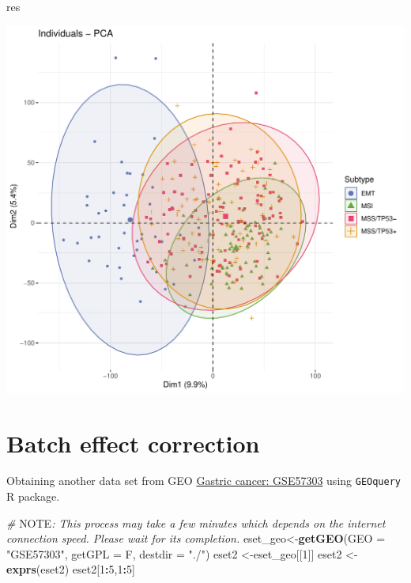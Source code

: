 \documentclass[
  12pt,
]{book}
\newenvironment{Shaded}{\begin{snugshade}}{\end{snugshade}}
\newcommand{\AlertTok}[1]{\textcolor[rgb]{0.94,0.16,0.16}{#1}}
\newcommand{\AttributeTok}[1]{\textcolor[rgb]{0.13,0.29,0.53}{#1}}
\newcommand{\CommentTok}[1]{\textcolor[rgb]{0.56,0.35,0.01}{\textit{#1}}}
\newcommand{\DecValTok}[1]{\textcolor[rgb]{0.00,0.00,0.81}{#1}}
\newcommand{\FunctionTok}[1]{\textcolor[rgb]{0.13,0.29,0.53}{\textbf{#1}}}
\newcommand{\NormalTok}[1]{#1}
\newcommand{\OtherTok}[1]{\textcolor[rgb]{0.56,0.35,0.01}{#1}}
\newcommand{\SpecialCharTok}[1]{\textcolor[rgb]{0.81,0.36,0.00}{\textbf{#1}}}
\newcommand{\StringTok}[1]{\textcolor[rgb]{0.31,0.60,0.02}{#1}}
\theoremstyle{definition}
\theoremstyle{definition}
\theoremstyle{definition}
\theoremstyle{definition}
\theoremstyle{remark}
\begin{document}
\begin{Shaded}
\begin{Highlighting}[]
\NormalTok{res}
\end{Highlighting}
\end{Shaded}

\begin{center}\includegraphics{_main_files/figure-latex/unnamed-chunk-14-1} \end{center}

\hypertarget{batch-effect-correction}{%
\section{Batch effect correction}\label{batch-effect-correction}}

Obtaining another data set from GEO \href{https://www.ncbi.nlm.nih.gov/pubmed/24935174/}{Gastric cancer: GSE57303} using \texttt{GEOquery} R package.

\begin{Shaded}
\begin{Highlighting}[]
\CommentTok{\# }\AlertTok{NOTE}\CommentTok{: This process may take a few minutes which depends on the internet connection speed. Please wait for its completion.}
\NormalTok{eset\_geo}\OtherTok{\textless{}{-}}\FunctionTok{getGEO}\NormalTok{(}\AttributeTok{GEO     =} \StringTok{"GSE57303"}\NormalTok{, }\AttributeTok{getGPL  =}\NormalTok{ F, }\AttributeTok{destdir =} \StringTok{"./"}\NormalTok{)}
\NormalTok{eset2    }\OtherTok{\textless{}{-}}\NormalTok{eset\_geo[[}\DecValTok{1}\NormalTok{]]}
\NormalTok{eset2    }\OtherTok{\textless{}{-}}\FunctionTok{exprs}\NormalTok{(eset2)}
\NormalTok{eset2[}\DecValTok{1}\SpecialCharTok{:}\DecValTok{5}\NormalTok{,}\DecValTok{1}\SpecialCharTok{:}\DecValTok{5}\NormalTok{]}
\end{Highlighting}
\end{Shaded}
\end{document}
